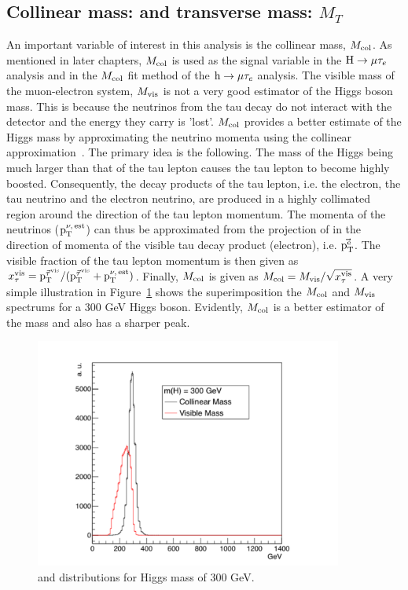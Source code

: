 \subsection{Collinear mass: \mcol and transverse mass: $M_{T}$}
An important variable of interest in this analysis is the collinear mass, $M_{\text{col}}$. As mentioned in later chapters, $M_{\text{col}}$ is used as the signal variable in the $\text{H} \to \mu \tau_{e}$ analysis and in the $M_{\text{col}}$ fit method of the $\text{h} \to \mu \tau_{e}$ analysis. The visible mass of the muon-electron system, $M_{\text{vis}}$ is not a very good estimator of the Higgs boson mass. This is because the neutrinos from the tau decay do not interact with the detector and the energy they carry is 'lost'. $M_{\text{col}}$ provides a better estimate of the Higgs mass by approximating the neutrino momenta using the collinear approximation~\cite{Ellis:1987xu}. The primary idea is the following. The mass of the Higgs being much larger than that of the tau lepton causes the tau lepton to become highly boosted. Consequently, the decay products of the tau lepton, i.e. the electron, the tau neutrino and the electron neutrino, are produced in a highly collimated region around the direction of the tau lepton momentum. The momenta of the neutrinos ($\text{p}_\text{T}^{\nu,\,\text{est}}$) can thus be approximated from the projection of \ptvecmiss in the direction of momenta of the visible tau decay product (electron), i.e. $\vec{\text{p}_\text{T}^{\text{e}}}$. The visible fraction of the tau lepton momentum is then given as $x_{\tau}^\text{vis}={\text{p}_\text{T}^{\vec{\tau}^{\text{vis}}}}/{(\text{p}_\text{T}^{\vec{\tau}^\text{vis}}+\text{p}_\text{T}^{\nu,\,\text{est}})}$. Finally, $M_{\text{col}}$ is given as $M_{\text{col}}= M_{\text{vis}} / \sqrt{\smash[b]{x_{\tau}^\text{vis}}}$. A very simple illustration in Figure~\ref{fig:mcol_v_mvis} shows the superimposition  the $M_{\text{col}}$ and $M_{\text{vis}}$ spectrums for a 300 GeV Higgs boson. Evidently, $M_{\text{col}}$ is a better estimator of the mass and also has a sharper peak.

\begin{figure}[!htpb]\centering
 \includegraphics[width=0.9\textwidth]{plots_and_figures/chapter4/mcol_v_mvis.pdf}
\caption{\mcol and \mvis distributions for Higgs mass of 300 GeV.}
 \label{fig:mcol_v_mvis}
\end{figure}


